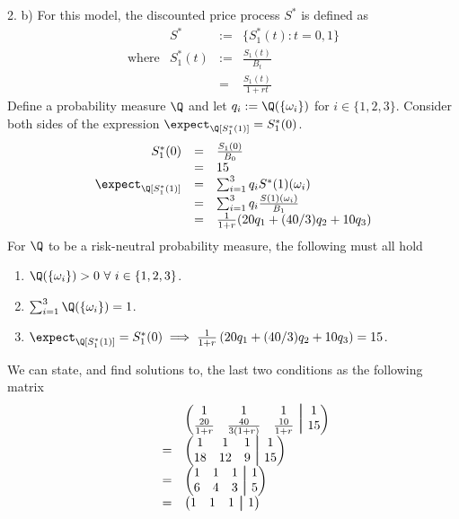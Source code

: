 \documentclass[11pt,a4paper]{article}
\newcommand\aug{\fboxsep=-\fboxrule\!\!\!\fbox{\strut}\!\!\!}
\begin{document}
\begin{answer}{2. b)}
  For this model, the discounted price process $S^*$ is defined as
  \[\begin{array}{rrrl}
    &S^*&:=&\{S_1^*(t):t=0,1\}\\
    \text{where}&S_1^*(t)&:=&\frac{S_1(t)}{B_t}\\
    &&=&\frac{S_1(t)}{1+rt}
  \end{array}\]
  Define a probability measure $\Q$ and let $q_i:=\Q(\{\omega_i\})$ for $i\in\{1,2,3\}$. Consider both sides of the expression $\expect_\Q[S_1^*(1)]=S_1^*(0)$.
  \[\begin{array}{rcl}
    S_1^*(0)&=&\frac{S_1(0)}{B_0}\\
    &=&15\\
    \expect_\Q[S_1^*(1)]&=&\sum_{i=1}^3q_iS^*(1)(\omega_i)\\
    &=&\sum_{i=1}^3q_i\frac{S(1)(\omega_i)}{B_1}\\
    &=&\frac1{1+r}(20q_1+(40/3)q_2+10q_3)
  \end{array}\]
  For $\Q$ to be a risk-neutral probability measure, the following must all hold
  \begin{enumerate}
    \item $\Q(\{\omega_i\})>0\ \forall\ i\in\{1,2,3\}$.
    \item $\sum_{i=1}^3\Q(\{\omega_i\})=1$.
    \item $\expect_\Q[S_1^*(1)]=S_1^*(0)\implies\frac1{1+r}\left(20q_1+(40/3)q_2+10q_3\right)=15$.
  \end{enumerate}
  We can state, and find solutions to, the last two conditions as the following matrix
  \[\begin{array}{rrcl}
    &&&\begin{pmatrix}
      1&1&1&\aug&1\\
      \frac{20}{1+r}&\frac{40}{3(1+r)}&\frac{10}{1+r}&\aug&15
    \end{pmatrix}\\
    &&=&\begin{pmatrix}
      1&1&1&\aug&1\\
      18&12&9&\aug&15
    \end{pmatrix}\\
    &&=&\begin{pmatrix}
      1&1&1&\aug&1\\
      6&4&3&\aug&5
    \end{pmatrix}\\
    &&=&\begin{pmatrix}
      1&1&1&\aug&1\\

\end{pmatrix}
\end{array}\]
\end{answer}
\end{document}
